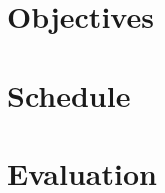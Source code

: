 \documentclass[a4paper,10pt]{article}
\begin{document}
\section{Objectives}


\section{Schedule}


\section{Evaluation}



\end{document}
